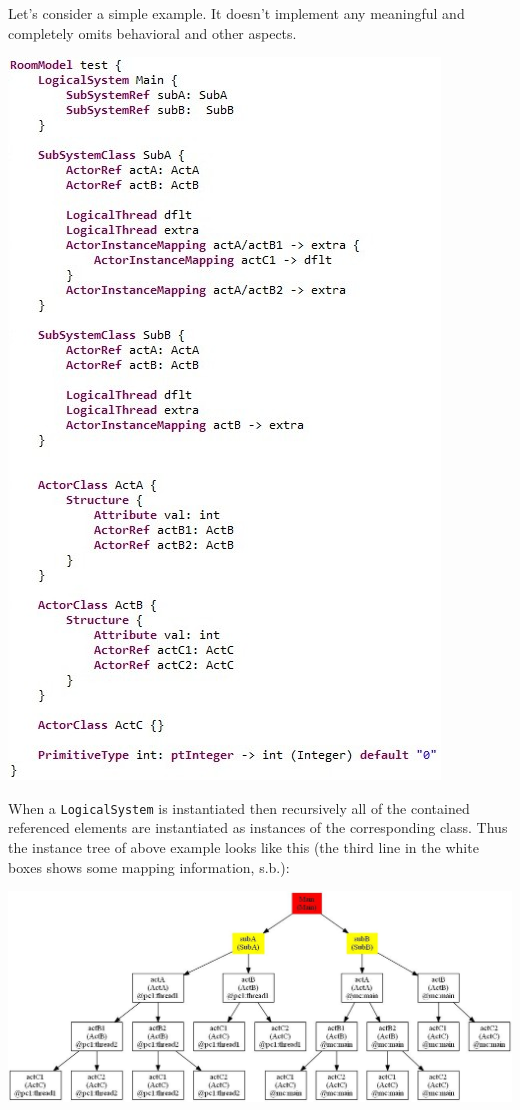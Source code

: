 Let's consider a simple example. It doesn't implement any meaningful and completely omits behavioral and 
other aspects.

\includegraphics{images/080-room.jpg}

When a \texttt{LogicalSystem} is instantiated then recursively all of the contained referenced elements are 
instantiated as instances of the corresponding class. Thus the instance tree of above example looks like 
this (the third line in the white boxes shows some mapping information, s.b.):

\includegraphics[scale=0.45]{images/080-instances.jpg}


